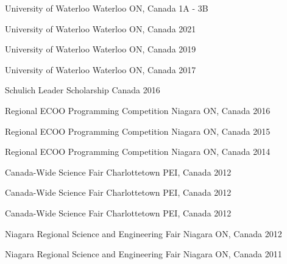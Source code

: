
\begin{cvhonors}

   {University of Waterloo} {Waterloo ON, Canada}
  {1A - 3B}

   {University of Waterloo}
  {Waterloo ON, Canada} {2021}

   {University of Waterloo}
  {Waterloo ON, Canada} {2019}

   {University of Waterloo}
  {Waterloo ON, Canada} {2017}

   {Schulich Leader Scholarship} {Canada} {2016}

   {Regional ECOO Programming Competition} {Niagara ON,
    Canada} {2016}

   {Regional ECOO Programming Competition} {Niagara ON,
    Canada} {2015}

   {Regional ECOO Programming Competition} {Niagara ON,
    Canada} {2014}

   {Canada-Wide Science Fair} {Charlottetown PEI, Canada}
  {2012}

   {Canada-Wide Science Fair} {Charlottetown
    PEI, Canada} {2012}

   {Canada-Wide Science Fair}
  {Charlottetown PEI, Canada} {2012}

   {Niagara Regional Science and Engineering Fair} {Niagara
    ON, Canada} {2012}

   {Niagara Regional Science and Engineering Fair} {Niagara
    ON, Canada} {2011}

\end{cvhonors}
